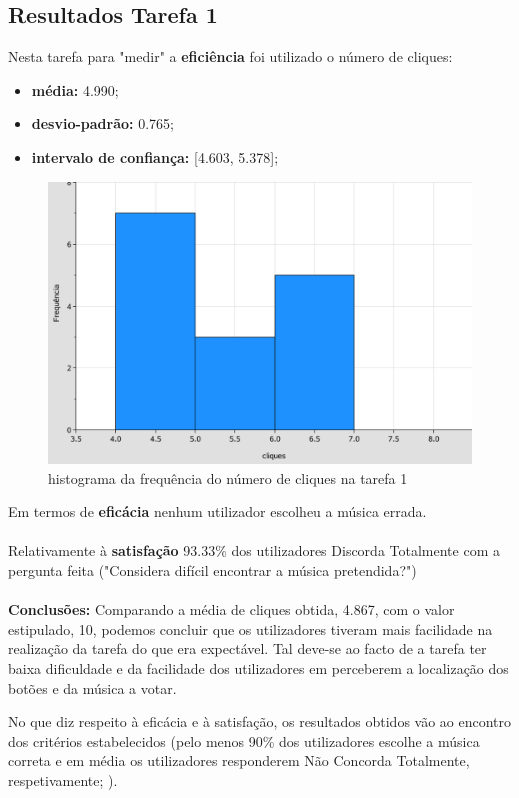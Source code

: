 \documentclass{article}
\begin{document}
\subsection*{Resultados Tarefa 1}
Nesta tarefa para "medir" a \textbf{eficiência} foi utilizado o número de cliques:
\begin{itemize}
\item\textbf{média:} 4.990;
\item\textbf{desvio-padrão:} 0.765;
\item\textbf{intervalo de confiança:} [4.603, 5.378]; 
\end{itemize}
\begin{figure}[H]
\centering
\includegraphics[scale=0.35]{grafico1}
\caption{histograma da frequência do número de cliques na tarefa 1}
\end{figure} Em termos de \textbf{eficácia} nenhum utilizador escolheu a música errada.\\\\
Relativamente à \textbf{satisfação} 93.33\% dos utilizadores Discorda Totalmente com a pergunta feita ("Considera difícil encontrar a música pretendida?")\\\\
\textbf{Conclusões:}
Comparando a média de cliques obtida, 4.867, com o valor estipulado, 10, podemos concluir que os utilizadores tiveram mais facilidade na realização da tarefa do que era expectável. Tal deve-se ao facto de a tarefa ter baixa dificuldade e da facilidade dos utilizadores em perceberem a localização dos botões e da música a votar.

 No que diz respeito à eficácia e à satisfação, os resultados obtidos vão ao encontro dos critérios estabelecidos (pelo menos 90\% dos utilizadores escolhe a música correta e em média os utilizadores responderem Não Concorda Totalmente, respetivamente; ).
 
\end{document}

